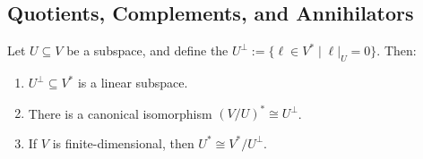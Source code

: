 \subsection{Quotients, Complements, and Annihilators}

\begin{proposition}
  \label{prop:annihilator_dual_quotient}
  Let $U \subseteq V$ be a subspace, and define the  $U^\perp := \{\ell \in V^* \mid \ell|_U = 0\}$. Then:
  \begin{enumerate}
    \item $U^\perp \subseteq V^*$ is a linear subspace.
    \item There is a canonical isomorphism $(V/U)^* \cong U^\perp$.
    \item If $V$ is finite-dimensional, then $U^* \cong V^*/U^\perp$.
  \end{enumerate}
\end{proposition}


